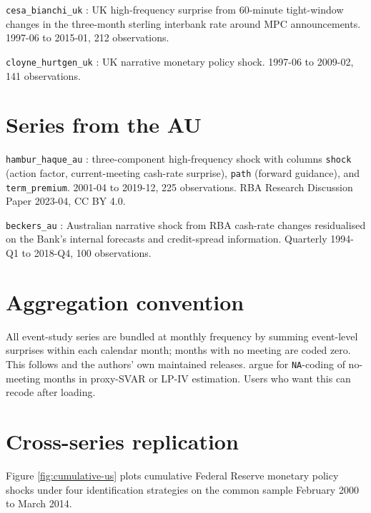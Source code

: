 \texttt{cesa\_bianchi\_uk} \citep{cesabianchi2020monetary}: UK high-frequency surprise from 60-minute tight-window changes in the three-month sterling interbank rate around MPC announcements. 1997-06 to 2015-01, 212 observations.

\texttt{cloyne\_hurtgen\_uk} \citep{cloyne2016macroeconomic}: UK narrative monetary policy shock. 1997-06 to 2009-02, 141 observations.

\section{Series from the AU}\label{series-from-the-au}

\texttt{hambur\_haque\_au} \citep{hambur2023monetary}: three-component high-frequency shock with columns \texttt{shock} (action factor, current-meeting cash-rate surprise), \texttt{path} (forward guidance), and \texttt{term\_premium}. 2001-04 to 2019-12, 225 observations. RBA Research Discussion Paper 2023-04, CC BY 4.0.

\texttt{beckers\_au} \citep{beckers2020credit}: Australian narrative shock from RBA cash-rate changes residualised on the Bank's internal forecasts and credit-spread information. Quarterly 1994-Q1 to 2018-Q4, 100 observations.

\section{Aggregation convention}\label{aggregation-convention}

All event-study series are bundled at monthly frequency by summing event-level surprises within each calendar month; months with no meeting are coded zero. This follows \citet{gertler2015monetary} and the authors' own maintained releases. \citet{bu2021unified} argue for \texttt{NA}-coding of no-meeting months in proxy-SVAR or LP-IV estimation. Users who want this can recode after loading.

\section{Cross-series replication}\label{cross-series-replication}

Figure \ref{fig:cumulative-us} plots cumulative Federal Reserve monetary policy shocks under four identification strategies on the common sample February 2000 to March 2014.

